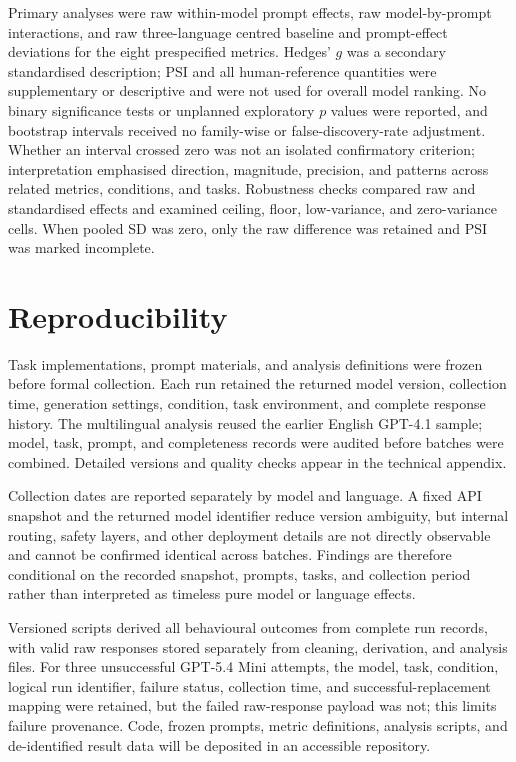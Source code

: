 \documentclass[logo,msc]{infthesis}
\begin{document}
Primary analyses were raw within-model prompt effects, raw model-by-prompt interactions, and raw three-language centred baseline and prompt-effect deviations for the eight prespecified metrics. Hedges' $g$ was a secondary standardised description; PSI and all human-reference quantities were supplementary or descriptive and were not used for overall model ranking. No binary significance tests or unplanned exploratory $p$ values were reported, and bootstrap intervals received no family-wise or false-discovery-rate adjustment. Whether an interval crossed zero was not an isolated confirmatory criterion; interpretation emphasised direction, magnitude, precision, and patterns across related metrics, conditions, and tasks. Robustness checks compared raw and standardised effects and examined ceiling, floor, low-variance, and zero-variance cells. When pooled SD was zero, only the raw difference was retained and PSI was marked incomplete.

\section{Reproducibility}

Task implementations, prompt materials, and analysis definitions were frozen before formal collection. Each run retained the returned model version, collection time, generation settings, condition, task environment, and complete response history. The multilingual analysis reused the earlier English GPT-4.1 sample; model, task, prompt, and completeness records were audited before batches were combined. Detailed versions and quality checks appear in the technical appendix.

Collection dates are reported separately by model and language. A fixed API snapshot and the returned model identifier reduce version ambiguity, but internal routing, safety layers, and other deployment details are not directly observable and cannot be confirmed identical across batches. Findings are therefore conditional on the recorded snapshot, prompts, tasks, and collection period rather than interpreted as timeless pure model or language effects.

Versioned scripts derived all behavioural outcomes from complete run records, with valid raw responses stored separately from cleaning, derivation, and analysis files. For three unsuccessful GPT-5.4 Mini attempts, the model, task, condition, logical run identifier, failure status, collection time, and successful-replacement mapping were retained, but the failed raw-response payload was not; this limits failure provenance. Code, frozen prompts, metric definitions, analysis scripts, and de-identified result data will be deposited in an accessible repository.
\end{document}

